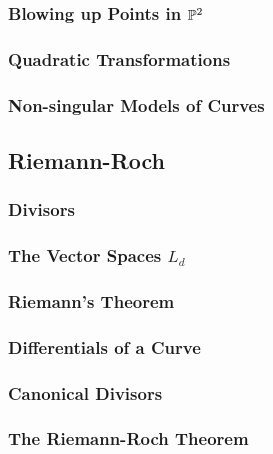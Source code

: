    \subsubsection{Blowing up Points in $\mathbb{P}^2$}
    \subsubsection{Quadratic Transformations}
    \subsubsection{Non-singular Models of Curves}
    \subsection{Riemann-Roch}
    \subsubsection{Divisors}
    \subsubsection{The Vector Spaces $L_d$}
    \subsubsection{Riemann's Theorem}
    \subsubsection{Differentials of a Curve}
    \subsubsection{Canonical Divisors}
    \subsubsection{The Riemann-Roch Theorem}

